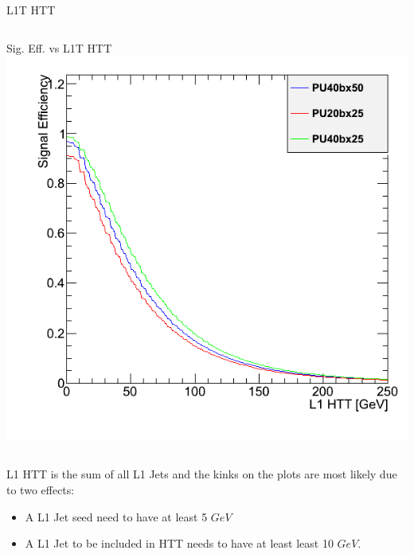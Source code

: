 \documentclass[8pt]{beamer}
\begin{document}
\begin{frame}{L1T HTT}
\begin{columns}
\begin{block}{Sig. Eff. vs L1T HTT}
\centering
\includegraphics[width=\linewidth]{img/hEffL1HTT.png}
 
\end{block}

\end{columns}

L1 HTT is the sum of all L1 Jets and the kinks on the  plots are most likely due to two effects:
\begin{itemize}
  \item A L1 Jet seed need to have at least 5 $GeV$
  \item A L1 Jet to be included in HTT needs to have at least least 10 $GeV$. 
\end{itemize}

\end{frame}
\end{document}
